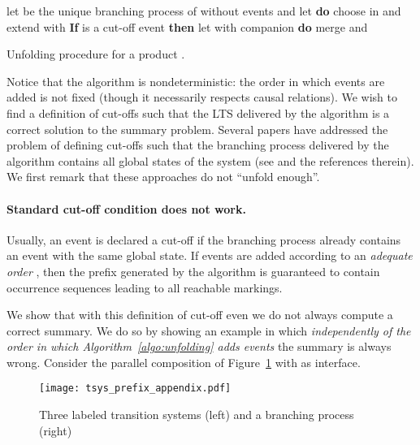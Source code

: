 \documentclass{llncs}
\begin{document}
\begin{algorithm}[htbp]
\begin{algorithmic}
\State let  be the unique branching process of  without events and let 
  {\bf do}
\State\hspace*{0.4cm} choose  in  and extend  with 
\State\hspace*{0.4cm} {\bf If}  is a cut-off event {\bf then} let 
  with companion  {\bf do} merge  and 
\end{algorithmic}
\caption{Unfolding procedure for a product .}
\label{algo:unfolding}
\end{algorithm}

Notice that the algorithm is nondeterministic: the order
in which events are added is not fixed (though it necessarily respects causal relations).
We wish to find a definition of cut-offs such that the LTS 
delivered by the algorithm
is a correct solution to the summary problem. 
Several papers have addressed the problem of defining cut-offs such that the
branching process delivered by the algorithm contains all global states of 
the system (see \cite{Esparza08} and the references therein). 
We first remark that these approaches do not ``unfold enough''.


\paragraph{\bf Standard cut-off condition does not work.}

Usually, an event  is declared a cut-off if the 
branching process already contains an event  with the 
same global state. If events are added according to an {\em adequate order} \cite{Esparza08}, then the prefix generated by the algorithm is guaranteed to contain occurrence sequences leading to all reachable markings.

We show that with this definition of cut-off even we do not always compute
a correct summary. We do so by showing an example in which {\em independently of the order in which Algorithm~\ref{algo:unfolding} adds events} the summary is always wrong. Consider the parallel composition of Figure~\ref{fig:transitionsystemsapp} with  as interface.

\begin{figure}[htbp]
\centering
\texttt{[image: tsys\_prefix\_appendix.pdf]}
\caption{Three labeled transition systems (left) and a branching process (right)}\label{fig:transitionsystemsapp}
\end{figure}
  
\end{document}
